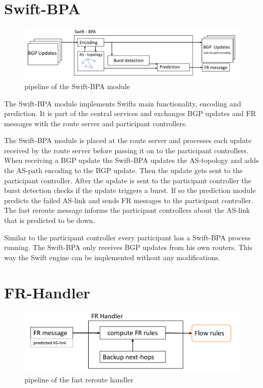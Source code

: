 \section{\label{chapter4:Swift-BPA}Swift-BPA}

\begin{figure}[h]
\center
\includegraphics[scale = 0.5]{Figures/design_swift_bpa_cropped.pdf}
\caption{pipeline of the Swift-BPA module}
\end{figure}

The Swift-BPA module implements Swifts main functionality, encoding and prediction. It is part of the central services and exchanges BGP updates and FR messages with the route server and participant controllers.

The Swift-BPA module is placed at the route server and processes each update received by the route server before passing it on to the participant controllers. 
When receiving a BGP update the Swift-BPA updates the AS-topology and adds the AS-path encoding to the BGP update. Then the update gets sent to the participant controller. 
After the update is sent to the participant controller the burst detection checks if the update triggers a burst. If so the prediction module predicts the failed AS-link and sends FR messages to the participant controller. 
The fast reroute message informs the participant controllers about the AS-link that is predicted to be down. 

Similar to the participant controller every participant has a Swift-BPA process running. The Swift-BPA only receives BGP updates from his own routers. This way the Swift engine can be implemented without any modifications.

\section{\label{chapter4:FR-handler}FR-Handler}

\begin{figure}[h]
\center
\includegraphics[scale = 0.6]{Figures/design_fr_handler_cropped.pdf}
\caption{pipeline of the fast reroute handler}
\end{figure}

